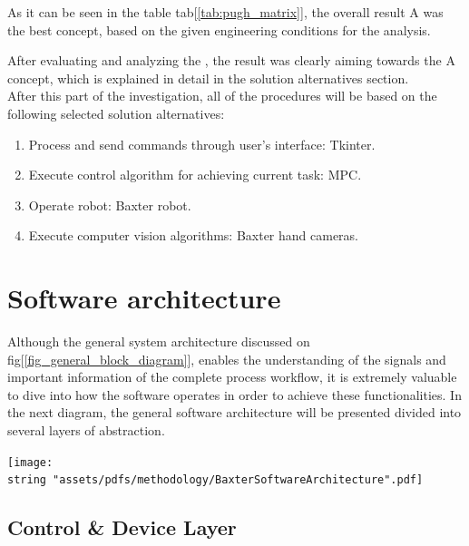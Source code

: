 \documentclass[11pt]{report} %
\begin{document}
As it can be seen in the table tab[\ref{tab:pugh_matrix}], the overall result A was the best concept, based on the given engineering conditions for the analysis.\

After evaluating and analyzing the , the result was clearly aiming towards the A concept, which is explained in detail in the solution alternatives section.\\

After this part of the investigation, all of the procedures will be based on the following selected solution alternatives:\\

\begin{enumerate}
    \item Process and send commands through user's interface: Tkinter.
    \item Execute control algorithm for achieving current task: MPC.
    \item Operate robot: Baxter robot.
    \item Execute computer vision algorithms: Baxter hand cameras.
\end{enumerate}


\section{Software architecture}

Although the general system architecture discussed on fig[\ref{fig_general_block_diagram}], enables the understanding of the signals and important information of the complete process workflow, it is extremely valuable to dive into how the software operates in order to achieve these functionalities. In the next diagram, the general software architecture will be presented divided into several layers of abstraction.\\

\begin{center}
\texttt{[image: \\string "assets/pdfs/methodology/BaxterSoftwareArchitecture".pdf]}
\bigbreak
\begin{minipage}{\linewidth} %
\label{fig_general_software_architecture}
\end{minipage} \end{center}


\subsection{Control \& Device Layer}
\end{document}
